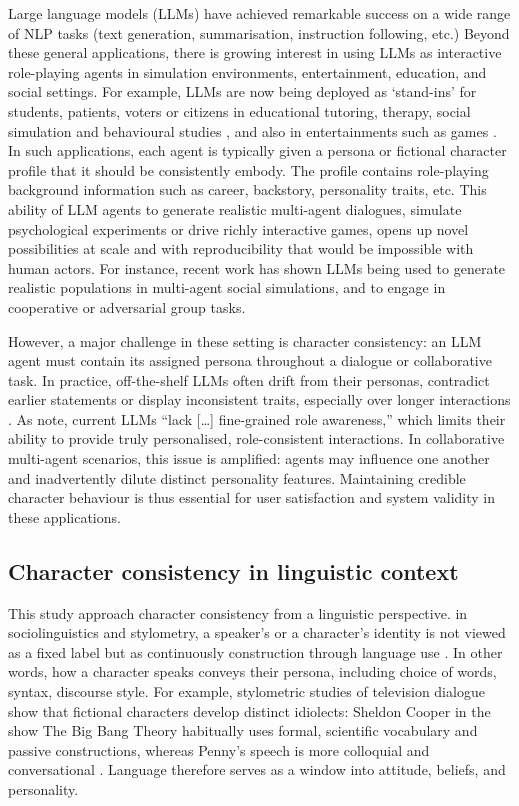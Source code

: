 \documentclass{article}
\begin{document}
Large language models (LLMs) have achieved remarkable success on a wide range of NLP tasks (text generation, summarisation, instruction following, etc.) \citep{ji2025enhancing,guo2024review} Beyond these general applications, there is growing interest in using LLMs as interactive role-playing agents in simulation environments, entertainment, education, and social settings. For example, LLMs are now being deployed as ‘stand-ins’ for students, patients, voters or citizens in educational tutoring, therapy, social simulation \citep{park2022social, park2023generative} and behavioural studies \citep{aher2023using}, and also in entertainments such as games \citep{xu2024survey}. In such applications, each agent is typically given a persona or fictional character profile that it should be consistently embody. The profile contains role-playing background information such as career, backstory, personality traits, etc. This ability of LLM agents to generate realistic multi-agent dialogues, simulate psychological experiments or drive richly interactive games, opens up novel possibilities at scale and with reproducibility that would be impossible with human actors. For instance, recent work has shown LLMs being used to generate realistic populations in multi-agent social simulations, and to engage in cooperative \citep{guo2026collab} or adversarial \citep{baltaji2024cultured} group tasks.

However, a major challenge in these setting is character consistency: an LLM agent must contain its assigned persona throughout a dialogue or collaborative task. In practice, off-the-shelf LLMs often drift from their personas, contradict earlier statements or display inconsistent traits, especially over longer interactions \citep{choi2024examining, bhandari2025can, abdulhai2025consistently}. As \citet{ji2025enhancing} note, current LLMs “lack […] fine-grained role awareness,” which limits their ability to provide truly personalised, role-consistent interactions. In collaborative multi-agent scenarios, this issue is amplified: agents may influence one another and inadvertently dilute distinct personality features. Maintaining credible character behaviour is thus essential for user satisfaction and system validity in these applications.

\subsection{Character consistency in linguistic context}
This study approach character consistency from a linguistic perspective. in sociolinguistics and stylometry, a speaker's or a character's identity is not viewed as a fixed label but as continuously construction through language use \citep{ przystalski2025stylometry}. In other words, how a character speaks conveys their persona, including choice of words, syntax, discourse style. For example, stylometric studies of television dialogue show that fictional characters develop distinct idiolects: Sheldon Cooper in the show The Big Bang Theory habitually uses formal, scientific vocabulary and passive constructions, whereas Penny's speech is more colloquial and conversational \citep{van2016stylometry}. Language therefore serves as a window into attitude, beliefs, and personality.
\end{document}
